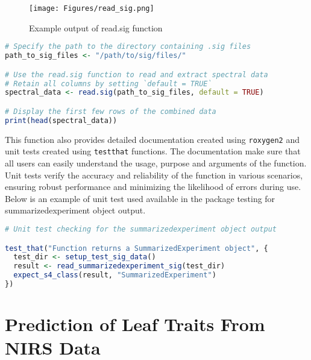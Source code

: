 \documentclass[12pt,a4paper]{report}
\begin{document}
\begin{figure}[h]
    \centering
    \texttt{[image: Figures/read\_sig.png]}
    \caption{Example output of read.sig function}
    \label{fig:read_sig}
\end{figure}

\begin{lstlisting}[language=R, style=mystyle]
# Specify the path to the directory containing .sig files
path_to_sig_files <- "/path/to/sig/files/"

# Use the read.sig function to read and extract spectral data
# Retain all columns by setting `default = TRUE`
spectral_data <- read.sig(path_to_sig_files, default = TRUE)

# Display the first few rows of the combined data
print(head(spectral_data))
\end{lstlisting}

This function also provides detailed documentation created using \texttt{roxygen2} and unit tests created using \texttt{testthat} functions. The documentation make sure that all users can easily understand the  usage, purpose and arguments of the function. Unit tests verify the accuracy and reliability of the function in various scenarios, ensuring robust performance and minimizing the likelihood of errors during use. Below is an example of unit test used available in the package testing for summarizedexperiment object output. \\

\begin{lstlisting}[language=R, style=mystyle]
# Unit test checking for the summarizedexperiment object output

test_that("Function returns a SummarizedExperiment object", {
  test_dir <- setup_test_sig_data()
  result <- read_summarizedexperiment_sig(test_dir)
  expect_s4_class(result, "SummarizedExperiment")
})
\end{lstlisting}


\section{Prediction of Leaf Traits From NIRS Data} 
\end{document}

